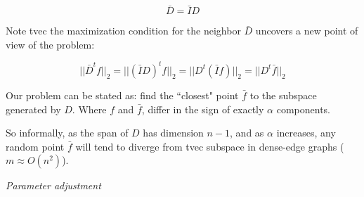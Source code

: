 \documentclass[a4paper,11pt]{article}
\begin{document}
$$\bar{D} = \bar{I} D$$

Note tvec the maximization condition for the neighbor $\bar{D}$ uncovers 
a new point of view of the problem:

$$||\bar{D}^tf||_2 = ||(\bar{I} D)^t f||_2 = ||D^t (\bar{I} f)||_2 = 
||D^t \bar{f}||_2$$

Our problem can be stated as: find the ``closest" point $\bar{f}$ to 
the subspace generated by $D$. Where $f$ and $\bar{f}$, differ in the 
sign of exactly $\alpha$ components.

\bigskip

So informally, as the span of $D$ has dimension $n-1$, and as $\alpha$ 
increases, any random point $\bar{f}$ will tend to diverge from tvec 
subspace in dense-edge graphs ($m \approx O(n^2)$).

\bigskip

\emph{Parameter adjustment}

\bigskip
\end{document}
